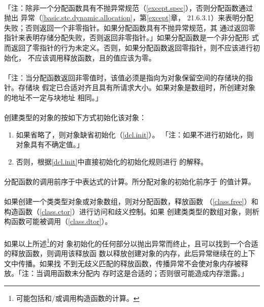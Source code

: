 \paragraph{}
「注：除非一个分配函数具有不抛异常规范（\ref{except.spec}），否则分配函数通过抛出
异常（\ref{basic.stc.dynamic.allocation}，第\ref{except}章，
21.6.3.1）来表明分配失败；否则返回一个非零指针。如果分配函数具有不抛异常规范，其
通过返回零指针来表明存储分配失败，否则返回非零指针。」如果分配函数是一个非分配形
式而返回了零指针的行为未定义。否则，如果分配函数返回零指针，则不应该进行初始化，
不应该调用释放函数，且的值应该为零。

\paragraph{}
「注：当分配函数返回非零值时，该值必须是指向为对象保留空间的存储块的指针。存储块
假定已合适对齐且具有所请求大小。如果对象是数组时，所创建对象的地址不一定与块地址
相同。」

\paragraph{}
创建类型的对象的按如下方式初始化该对象：
\begin{enumerate}
  \item{如果省略了，则对象缺省初始化（\ref{dcl.init}）。
    「注：如果不进行初始化，则对象具有不确定值。」}
  \item{否则，根据\ref{dcl.init}中直接初始化的初始化规则进行
    的解释。}
\end{enumerate}

\paragraph{}
分配函数的调用前序于中表达式的计算。所分配对象的初始化前序于
的值计算。

\paragraph{}
如果创建一个类类型对象或对象数组，则对分配函数，释放函数
（\ref{class.free}）和构造函数（\ref{class.ctor}）进行访问和歧义控制。如果
创建类类型的数组对象，则析构函数可能被调用（\ref{class.dtor}）。

\paragraph{}
如果以上所述\footnote{可能包括和/或调用构造函数的计算。}的对
象初始化的任何部分以抛出异常而终止，且可以找到一个合适的释放函数，则调用该释放函
数以释放创建对象的内存，此后异常继续在的上下文中传播。如果找
不到无歧义匹配的释放函数，传播异常不会使对象内存被释放。「注：当调用函数未分配内
存时这是合适的；否则很可能造成内存泄露。」

